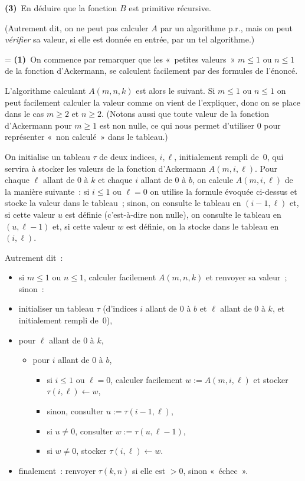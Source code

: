 \documentclass[12pt,a4paper]{article}
\theoremstyle{definition}
\newif\ifcorrige
\newenvironment{corrige}%
{\ifcorrige\relax\else\setbox0=\vbox\bgroup\fi%
\smallbreak\footnotesize\noindent{\underbar{\textit{Corrigé.}}\quad}}
{{\hbox{}\nobreak\hfill\checkmark}%
\ifcorrige\relax\else\egroup\fi\par}
\begin{document}
\textbf{(3)} En déduire que la fonction $B$ est primitive récursive.

(Autrement dit, on ne peut pas calculer $A$ par un algorithme p.r.,
mais on peut \emph{vérifier} sa valeur, si elle est donnée en entrée,
par un tel algorithme.)

\begin{corrige}
\textbf{(1)} On commence par remarquer que les « petites valeurs »
$m\leq 1$ ou $n\leq 1$ de la fonction d'Ackermann, se calculent
facilement par des formules de l'énoncé.

L'algorithme calculant $A(m,n,k)$ est alors le suivant.  Si $m\leq 1$
ou $n\leq 1$ on peut facilement calculer la valeur comme on vient de
l'expliquer, donc on se place dans le cas $m \geq 2$ et $n \geq 2$.
(Notons aussi que toute valeur de la fonction d'Ackermann pour $m\geq
1$ est non nulle, ce qui nous permet d'utiliser $0$ pour représenter
« non calculé » dans le tableau.)

On initialise un tableau $\tau$ de deux indices, $i,\ell$,
initialement rempli de $0$, qui servira à stocker les valeurs de la
fonction d'Ackermann $A(m,i,\ell)$.  Pour chaque $\ell$ allant de $0$
à $k$ et chaque $i$ allant de $0$ à $b$, on calcule $A(m,i,\ell)$ de
la manière suivante : si $i\leq 1$ ou $\ell=0$ on utilise la formule
évoquée ci-dessus et stocke la valeur dans le tableau ; sinon, on
consulte le tableau en $(i-1,\ell)$ et, si cette valeur $u$ est
définie (c'est-à-dire non nulle), on consulte le tableau en
$(u,\ell-1)$ et, si cette valeur $w$ est définie, on la stocke dans le
tableau en $(i,\ell)$.

Autrement dit :
\begin{itemize}
\item si $m\leq 1$ ou $n\leq 1$, calculer facilement $A(m,n,k)$ et
  renvoyer sa valeur ; sinon :
\item initialiser un tableau $\tau$ (d'indices $i$ allant de $0$ à $b$
  et $\ell$ allant de $0$ à $k$, et initialement rempli de $0$),
\item pour $\ell$ allant de $0$ à $k$,
\begin{itemize}
\item pour $i$ allant de $0$ à $b$,
\begin{itemize}
\item si $i\leq 1$ ou $\ell=0$, calculer facilement $w := A(m,i,\ell)$
  et stocker $\tau(i,\ell) \leftarrow w$,
\item sinon, consulter $u := \tau(i-1,\ell)$,
\item si $u \neq 0$, consulter $w := \tau(u,\ell-1)$,
\item si $w \neq 0$, stocker $\tau(i,\ell) \leftarrow w$.
\end{itemize}
\end{itemize}
\item finalement : renvoyer $\tau(k,n)$ si elle est $>0$, sinon
  « échec ».
\end{itemize}


\end{corrige}
\end{document}

